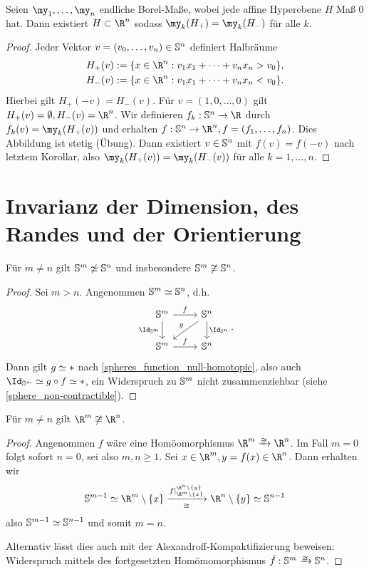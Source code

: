 \begin{st}
	Seien $\my_1, \dotsc, \my_n$ endliche Borel-Maße, wobei jede affine Hyperebene $H$ Maß 0 hat.
	Dann existiert $H \subset \R^n$ sodass $\my_k(H_+) = \my_k(H_-)$ für alle $k$.
	\begin{proof}
		Jeder Vektor $v = (v_0, \dotsc, v_n) \in \S^n$ definiert Halbräume
		\begin{align*}
			H_+(v) &:= \{x \in \R^n : v_1x_1 + \dotsb + v_n x_n > v_0 \}, \\
			H_-(v) &:= \{x \in \R^n : v_1x_1 + \dotsb + v_n x_n < v_0 \}.
		\end{align*}
		Hierbei gilt $H_+(-v) = H_-(v)$.
		Für $v = (1, 0, \dotsc, 0)$ gilt $H_+(v) = \emptyset, H_-(v) = \R^n$.
		Wir definieren $f_k: \S^n \to \R$ durch $f_k(v) = \my_k(H_+(v))$ und erhalten $f: \S^n \to \R^n, f = (f_1, \dotsc, f_n)$.
		Dies Abbildung ist stetig (Übung).
		Dann existiert $v \in \S^n$ mit $f(v) = f(-v)$ nach letztem Korollar, also $\my_k(H_+(v)) = \my_k(H_-(v))$ für alle $k = 1, \dotsc, n$.
	\end{proof}
\end{st}


\section{Invarianz der Dimension, des Randes und der Orientierung}


\begin{st}
	Für $m \neq n$ gilt $\S^m \not\homotopic \S^n$ und insbesondere $\S^m \not\homeomorphic \S^n$.
	\begin{proof}
		Sei \oBdA $m > n$.
		Angenommen $\S^m \homotopic \S^n$, d.h.
		\[
			\begin{tikzcd}
				\S^m \arrow{r}{f} \arrow{d}[swap]{\Id_{\S^m}} & \S^n \arrow{d}{\Id_{\S^n}} \arrow{dl}[swap]{g} \\
				\S^m \arrow{r}{f} & \S^n
			\end{tikzcd}.
		\]
		Dann gilt $g \homotopic *$ nach \ref{spheres_function_null-homotopic}, also auch $\Id_{\S^m} \homotopic g \circ f \homotopic *$, ein Widerspruch zu $\S^m$ nicht zusammenziehbar (siehe \ref{sphere_non-contractible}).
	\end{proof}
\end{st}

\begin{kor}
	Für $m \neq n$ gilt $\R^m \not\homeomorphic \R^n$.
	\begin{proof}
		Angenommen $f$ wäre eine Homöomorphismus $\R^m \homeomorphicto \R^n$.
		Im Fall $m = 0$ folgt sofort $n = 0$, sei also $m, n \ge 1$.
		Sei $x \in \R^m, y = f(x) \in \R^n$.
		Dann erhalten wir
		\[
			\S^{m-1} \homotopic \R^m \setminus \{x\} \xrightarrow[\homeomorphic]{f|_{\R^m \setminus \{x\}}^{\R^n \setminus \{y\}}} \R^n \setminus \{y\} \homotopic \S^{n-1}
		\]
		also $\S^{m-1} \homotopic \S^{n-1}$ und somit $m = n$.

		Alternativ lässt dies auch mit der Alexandroff-Kompaktifizierung beweisen: Widerspruch mittels des fortgesetzten Homömomorphismus $\hat f: \S^m \homeomorphicto \S^n$.
	\end{proof}
\end{kor}

